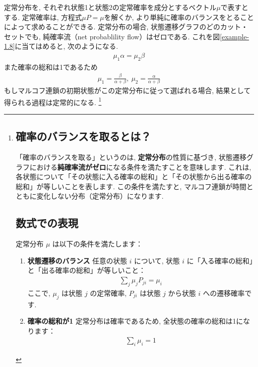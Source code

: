 \documentclass[a4j]{jsarticle}
\begin{document}
定常分布を, それぞれ状態1と状態2の定常確率を成分とするベクトル$\mu$で表すとする. 定常確率は, 方程式$\mu P = \mu$を解くか, より単純に確率のバランスをとることによって求めることができる. 定常分布の場合, 状態遷移グラフのどのカット・セットでも, 純確率流（net probablility flow）はゼロである. これを図\ref{example-1.8}に当てはめると, 次のようになる.
\begin{align}
	\mu_1\alpha = \mu_2\beta
\end{align}
また確率の総和は1であるため
\begin{align}
	\mu_1 = \frac{\beta}{\alpha + \beta},\: \mu_2 = \frac{\alpha}{\alpha + \beta}
\end{align}
もしマルコフ連鎖の初期状態がこの定常分布に従って選ばれる場合, 結果として得られる過程は定常的になる.
\footnote{
	\subsection*{確率のバランスを取るとは？}

	「確率のバランスを取る」というのは, \textbf{定常分布}の性質に基づき, 状態遷移グラフにおける\textbf{純確率流がゼロ}になる条件を満たすことを意味します.
	これは, 各状態について「その状態に入る確率の総和」と「その状態から出る確率の総和」が等しいことを表します. この条件を満たすと, マルコフ連鎖が時間とともに変化しない分布（定常分布）になります.

	\subsection*{数式での表現}

	定常分布 $\mu$ は以下の条件を満たします：

	\begin{enumerate}
		\item \textbf{状態遷移のバランス}
		      任意の状態 $i$ について, 状態 $i$ に「入る確率の総和」と「出る確率の総和」が等しいこと：
		      \begin{align*}
			      \sum_{j} \mu_j P_{ji} = \mu_i
		      \end{align*}
		      ここで, $\mu_j$ は状態 $j$ の定常確率, $P_{ji}$ は状態 $j$ から状態 $i$ への遷移確率です.

		\item \textbf{確率の総和が1}
		      定常分布は確率であるため, 全状態の確率の総和は1になります：
		      \begin{align*}
			      \sum_{i} \mu_i = 1
		      \end{align*}
	\end{enumerate}

}
\end{document}
